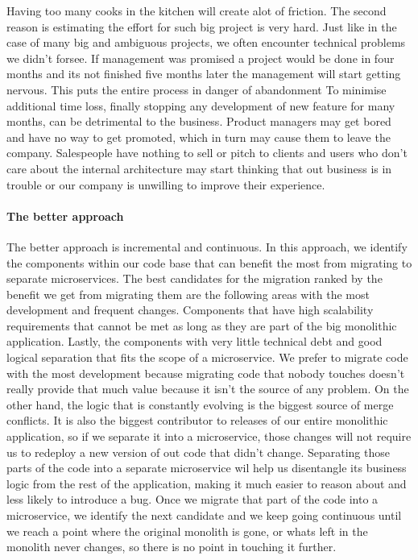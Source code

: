 Having too many cooks in the kitchen will create alot of friction.
The second reason is estimating the effort for such big project is very hard.
Just like in the case of many big and ambiguous projects, we often encounter technical problems we didn't forsee.
If management was promised a project would be done in four months and its not finished five months later the management will start getting nervous.
This puts the entire process in danger of abandonment
To minimise additional time loss, finally stopping any development of new feature for many months, can be detrimental to the business.
Product managers may get bored and have no way to get promoted, which in turn may cause them to leave the company.
Salespeople have nothing to sell or pitch to clients and users who don't care about the internal architecture may start thinking that out business is in trouble or our company is unwilling to improve their experience.

\paragraph{The better approach}
The better approach is incremental and continuous.
In this approach, we identify the components within our code base that can benefit the most from migrating to separate microservices.
The best candidates for the migration ranked by the benefit we get from migrating them are the following areas with the most development and frequent changes.
Components that have high scalability requirements that cannot be met as long as they are part of the big monolithic application.
Lastly, the components with very little technical debt and good logical separation that fits the scope of a microservice.
We prefer to migrate code with the most development because migrating code that nobody touches doesn't really provide that much value because it isn't the source of any problem.
On the other hand, the logic that is constantly evolving is the biggest source of merge conflicts.
It is also the biggest contributor to releases of our entire monolithic application, so if we separate it into a microservice, those changes will not require us to redeploy a new version of out code that didn't change.
Separating those parts of the code into a separate microservice wil help us disentangle its business logic from the rest of the application, making it much easier to reason about and less likely to introduce a bug.
Once we migrate that part of the code into a microservice, we identify the next candidate and we keep going continuous until we reach a point where the original monolith is gone, or whats left in the monolith never changes, so there is no point in touching it further.


